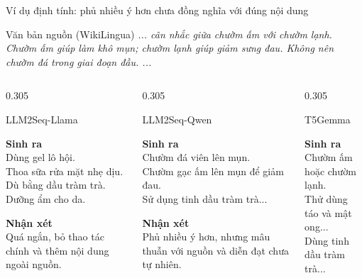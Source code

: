 \documentclass[aspectratio=169,11pt]{beamer}
\begin{document}
\begin{frame}{Ví dụ định tính: phủ nhiều ý hơn chưa đồng nghĩa với đúng nội dung}
  \begin{block}{Văn bản nguồn (WikiLingua)}
    \small \textit{... cân nhắc giữa \textcolor{green!50!black}{chườm ấm với chườm lạnh}. Chườm ấm giúp làm khô mụn; chườm lạnh giúp giảm sưng đau. \textcolor{LLMRed}{Không nên chườm đá trong giai đoạn đầu}. ...}
  \end{block}

  \vspace{0.05em}
  \begin{columns}[T,onlytextwidth]
    \begin{column}{0.305\textwidth}
      \begin{alertblock}{LLM2Seq-Llama}
        \begin{minipage}[t][3.05cm][t]{\linewidth}
        \scriptsize\raggedright
        \textbf{Sinh ra}\\
        Dùng gel lô hội.\\
        Thoa sữa rửa mặt nhẹ dịu.\\
        Dù bằng dầu tràm trà.\\
        Dưỡng ẩm cho da.

        \vspace{0.35em}
        \textbf{Nhận xét}\\
        Quá ngắn, bỏ thao tác chính và thêm nội dung ngoài nguồn.
        \end{minipage}
      \end{alertblock}
    \end{column}
    \hfill
    \begin{column}{0.305\textwidth}
      \begin{exampleblock}{LLM2Seq-Qwen}
        \begin{minipage}[t][3.05cm][t]{\linewidth}
        \scriptsize\raggedright
        \textbf{Sinh ra}\\
        \textcolor{LLMRed}{Chườm đá viên lên mụn.}\\
        \textcolor{green!50!black}{Chườm gạc ấm} lên mụn để giảm đau.\\
        Sử dụng tinh dầu tràm trà...

        \vspace{0.35em}
        \textbf{Nhận xét}\\
        Phủ nhiều ý hơn, nhưng mâu thuẫn với nguồn và diễn đạt chưa tự nhiên.
        \end{minipage}
      \end{exampleblock}
    \end{column}
    \hfill
    \begin{column}{0.305\textwidth}
      \begin{block}{T5Gemma}
        \begin{minipage}[t][3.05cm][t]{\linewidth}
        \scriptsize\raggedright
        \textbf{Sinh ra}\\
        Chườm ấm hoặc chườm lạnh.\\
        Thử dùng táo và mật ong...\\
        Dùng tinh dầu tràm trà...


\end{minipage}
\end{block}
\end{column}
\end{columns}
\end{frame}
\end{document}
